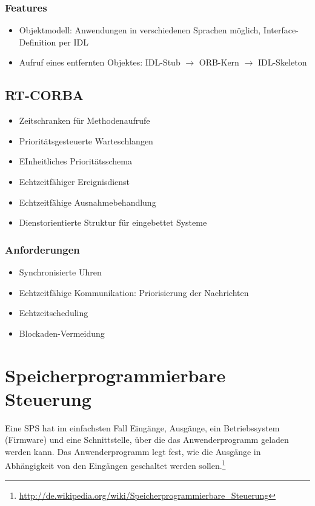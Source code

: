 \subsubsection{Features}
\begin{itemize}
	\item Objektmodell: Anwendungen in verschiedenen Sprachen möglich, Interface-Definition per IDL
	\item Aufruf eines entfernten Objektes: IDL-Stub $\rightarrow$ ORB-Kern $\rightarrow$ IDL-Skeleton
\end{itemize}


\subsection{RT-CORBA}
\begin{itemize}
	\item Zeitschranken für Methodenaufrufe
	\item Prioritätsgesteuerte Warteschlangen
	\item EInheitliches Prioritätsschema
	\item Echtzeitfähiger Ereignisdienst
	\item Echtzeitfähige Ausnahmebehandlung
	\item Dienstorientierte Struktur für eingebettet Systeme
\end{itemize}

\subsubsection{Anforderungen}
\begin{itemize}
	\item Synchronisierte Uhren
	\item Echtzeitfähige Kommunikation: Priorisierung der Nachrichten
	\item Echtzeitscheduling
	\item Blockaden-Vermeidung
\end{itemize}



\section{Speicherprogrammierbare Steuerung}
Eine SPS hat im einfachsten Fall Eingänge, Ausgänge, ein Betriebssystem (Firmware) und eine Schnittstelle, über die das Anwenderprogramm geladen werden kann. Das Anwenderprogramm legt fest, wie die Ausgänge in Abhängigkeit von den Eingängen geschaltet werden sollen.\footnote{\url{http://de.wikipedia.org/wiki/Speicherprogrammierbare_Steuerung}}


